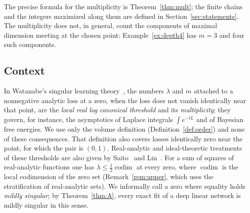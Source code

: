 \documentclass[11pt,a4paper]{article}
\theoremstyle{definition}
\theoremstyle{remark}
\numberwithin{equation}{section}
\newcommand{\codim}{\operatorname{codim}}
\providecommand{\DIFaddtex}[1]{{\protect\color{blue}#1}} %
\providecommand{\DIFaddbegin}{} %
\providecommand{\DIFaddend}{} %
\providecommand{\DIFadd}[1]{\texorpdfstring{\DIFaddtex{#1}}{#1}} %
\begin{document}
The precise formula for the multiplicity is Theorem~\ref{thm:mult}; the finite chains and the integers maximized along them are defined in Section~\ref{sec:statements}. The multiplicity does not, in general, count the components of maximal dimension meeting at the chosen point: Example~\ref{ex:depth4} has $m=3$ and four such components.

\subsection{Context}
In Watanabe's singular learning theory~\cite{watanabe-book,watanabe-2018}, the numbers $\lambda$ and $m$ attached to a nonnegative analytic loss at a zero, when the loss does not vanish identically near that point, are the \emph{local real log canonical threshold} and its \emph{multiplicity}; they govern, for instance, the asymptotics of Laplace integrals $\int e^{-tL}$ and of Bayesian free energies. We use only the volume definition (Definition~\ref{def:order}) and none of these consequences. That definition also covers losses identically zero near the point, for which the pair is $(0,1)$. Real-analytic and ideal-theoretic treatments of these thresholds are also given by Saito~\cite{saito} and Lin~\cite{lin}. For a sum of squares of real-analytic functions one has $\lambda\le\frac{1}{2}\codim$ at every zero, where $\codim$ is the local codimension of the zero set (Remark~\ref{rem:upper}, which uses the stratification of real-analytic sets). \DIFaddbegin \DIFadd{We informally call a zero where equality holds }\emph{\DIFadd{mildly singular}}\DIFadd{; by Theorem~\ref{thm:A}, every exact fit of a deep linear network is mildly singular in this sense.
}\DIFaddend 
\end{document}

